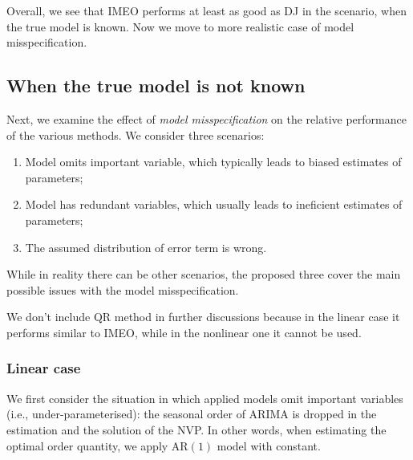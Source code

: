 \documentclass{article}
\begin{document}
Overall, we see that IMEO performs at least as good as DJ in the scenario, when the true model is known. Now we move to more realistic case of model misspecification.


\subsection{When the true model is not known}

Next, we examine the effect of \emph{model misspecification} on the relative performance of the various methods. We consider three scenarios:
\begin{enumerate}
    \item Model omits important variable, which typically leads to biased estimates of parameters;
    \item Model has redundant variables, which usually leads to ineficient estimates of parameters;
    \item The assumed distribution of error term is wrong.
\end{enumerate}
While in reality there can be other scenarios, the proposed three cover the main possible issues with the model misspecification.

We don't include QR method in further discussions because in the linear case it performs similar to IMEO, while in the nonlinear one it cannot be used.


\subsubsection{Linear case} \label{sub:exp3}

We first consider the situation in which applied models omit important variables (i.e., under-parameterised): the seasonal order of ARIMA is dropped in the estimation and the solution of the NVP. In other words, when estimating the optimal order quantity, we apply AR$(1)$ model with constant.
\end{document}
